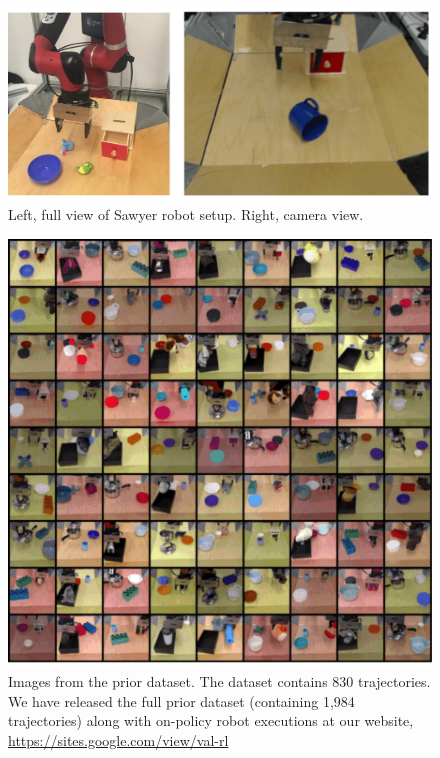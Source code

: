 \documentclass[letterpaper, 10 pt, conference]{ieeeconf}  %
\begin{document}
\begin{figure}[b]
  \includegraphics[width=0.99\linewidth]{imgs/fig_appendix_robot.pdf}
  \caption{\small
  Left, full view of Sawyer robot setup. Right, camera view.
  }
  \label{fig:appendix_robot}
  \vspace{-0.5cm}
\end{figure}

\begin{figure}
  \includegraphics[width=0.99\linewidth]{imgs/prior_data_grid.png}
  \caption{\small
  Images from the prior dataset. The dataset contains 830 trajectories. We have released the full prior dataset (containing 1,984 trajectories) along with on-policy robot executions at our website, \url{https://sites.google.com/view/val-rl}
  }
  \label{fig:appendix_dataset_imgs}
  \vspace{-0.5cm}
\end{figure}
\end{document}
